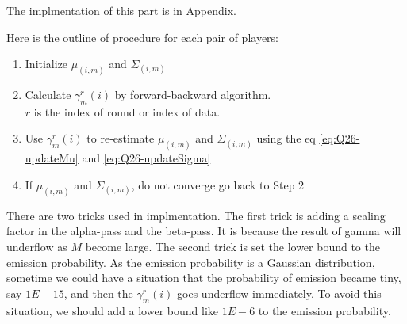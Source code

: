 \documentclass[12pt]{article}
\newenvironment{problem}[2][Problem]{\begin{trivlist}
\item[\hskip \labelsep {\bfseries #1}\hskip \labelsep {\bfseries #2.}]}{\end{trivlist}}
\begin{document}
\begin{problem}{2.6.19}
The implmentation of this part is in Appendix.

Here is the outline of procedure for each pair of players:
\begin{enumerate}[Step 1:]
    \item Initialize $\mu_{(i,m)}$ and $\Sigma_{(i,m)}$
    \item Calculate $\gamma^{r}_{m}(i)$ by forward-backward algorithm. \\
          $r$ is the index of round or index of data.
    \item Use $\gamma^{r}_{m}(i)$ to re-estimate $\mu_{(i,m)}$ and $\Sigma_{(i,m)}$
            using the eq \eqref{eq:Q26-updateMu} and \eqref{eq:Q26-updateSigma}
    \item If $\mu_{(i,m)}$ and $\Sigma_{(i,m)}$, do not converge go back to Step 2
\end{enumerate}

There are two tricks used in implmentation. The first trick is adding a scaling
factor in the alpha-pass and the beta-pass. It is because the result of gamma will 
underflow as $M$ become large. The second trick is set the lower bound to the 
emission probability. As the emission probability is a Gaussian distribution, 
sometime we could have a situation that the probability of emission became tiny,
say $1E-15$, and then the $\gamma^{r}_{m}(i)$ goes underflow immediately. To avoid
this situation, we should add a lower bound like $1E-6$ to the emission probability.
\end{problem}
\end{document}
